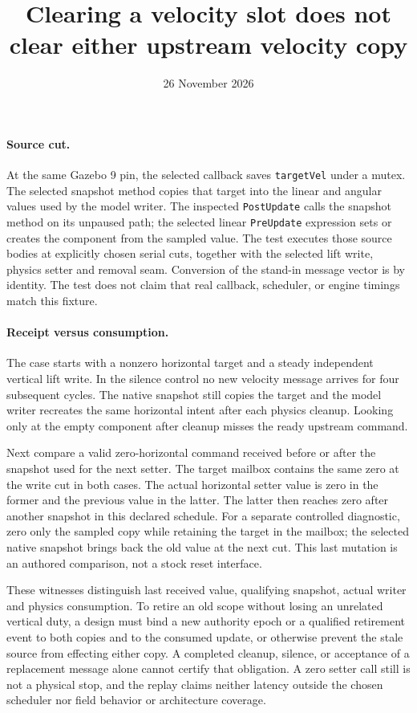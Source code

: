 \documentclass[11pt]{article}
\title{Clearing a velocity slot does not clear either upstream velocity copy}
\date{26 November 2026}
\begin{document}
\maketitle
\paragraph{Source cut.}
At the same Gazebo 9 pin, the selected callback saves
\texttt{targetVel} under a mutex. The selected snapshot method
copies that target into the linear and angular values used by
the model writer. The inspected \texttt{PostUpdate} calls the
snapshot method on its unpaused path; the selected linear
\texttt{PreUpdate} expression sets or creates the component
from the sampled value. The test executes those source bodies
at explicitly chosen serial cuts, together with the selected
lift write, physics setter and removal seam. Conversion of the
stand-in message vector is by identity. The test does not claim
that real callback, scheduler, or engine timings match this fixture.

\paragraph{Receipt versus consumption.}
The case starts with a nonzero horizontal target and a steady
independent vertical lift write. In the silence control no new
velocity message arrives for four subsequent cycles. The native
snapshot still copies the target and the model writer recreates
the same horizontal intent after each physics cleanup. Looking
only at the empty component after cleanup misses the ready
upstream command.

Next compare a valid zero-horizontal command received before or
after the snapshot used for the next setter. The target mailbox
contains the same zero at the write cut in both cases. The actual
horizontal setter value is zero in the former and the previous
value in the latter. The latter then reaches zero after another
snapshot in this declared schedule. For a separate controlled
diagnostic, zero only the sampled copy while retaining the target
in the mailbox; the selected native snapshot brings back the
old value at the next cut. This last mutation is an authored
comparison, not a stock reset interface.

These witnesses distinguish last received value, qualifying
snapshot, actual writer and physics consumption. To retire an
old scope without losing an unrelated vertical duty, a design
must bind a new authority epoch or a qualified retirement event
to both copies and to the consumed update, or otherwise prevent
the stale source from effecting either copy. A completed cleanup,
silence, or acceptance of a replacement message alone cannot
certify that obligation. A zero setter call still is not a
physical stop, and the replay claims neither latency outside
the chosen scheduler nor field behavior or architecture coverage.
\end{document}
